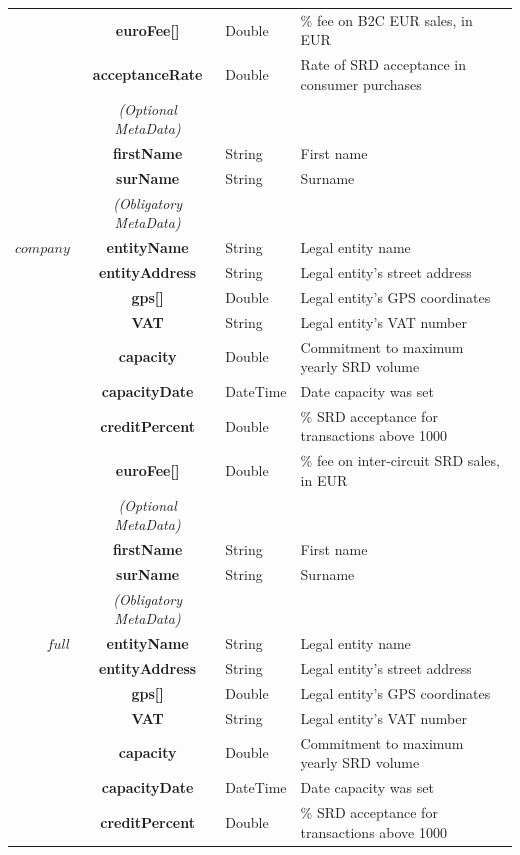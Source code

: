 \begin{table}[H]
\begin{centering}
{\begin{tabular}{ r | c | l | l }
			& {\bf euroFee[]}			&Double	& \% fee on B2C EUR sales, in EUR \\
			& {\bf acceptanceRate}		&Double	& Rate of SRD acceptance in consumer purchases\\
\cline{2-2}
			 & \emph{(Optional MetaData)}& & \\
\cline{2-2}
			& {\bf firstName	}			&String	& First name \\
			& {\bf surName}			&String	& Surname \\
\Xhline{1.5pt}
			& \emph{(Obligatory MetaData)} & & \\
\cline{2-2}
$company$	& {\bf entityName}			&String	& Legal entity name \\
			& {\bf entityAddress}			&String	& Legal entity's street address \\
			& {\bf gps[]}				&Double	& Legal entity's GPS coordinates \\
			& {\bf VAT}				&String	& Legal entity's VAT number \\
			& {\bf capacity}				&Double	& Commitment to maximum yearly SRD volume \\
			& {\bf capacityDate}			&DateTime & Date capacity was set \\
			& {\bf creditPercent}			&Double	& \% SRD acceptance for transactions above 1000 \\
			& {\bf euroFee[]}			&Double	& \% fee on inter-circuit SRD sales, in EUR \\
\cline{2-2}
			 & \emph{(Optional MetaData)}& & \\
\cline{2-2}
			& {\bf firstName	}			&String & First name \\
			& {\bf surName}			&String & Surname \\
\Xhline{1.5pt}
			& \emph{(Obligatory MetaData)} & & \\
\cline{2-2}
$full$		& {\bf entityName}			&String	& Legal entity name \\
			& {\bf entityAddress}			&String	& Legal entity's street address \\
			& {\bf gps[]}				&Double	& Legal entity's GPS coordinates \\
			& {\bf VAT}				&String	& Legal entity's VAT number \\
			& {\bf capacity}				&Double	& Commitment to maximum yearly SRD volume \\
			& {\bf capacityDate}			&DateTime & Date capacity was set \\
			& {\bf creditPercent}			&Double	& \% SRD acceptance for transactions above 1000 \\

\end{tabular}}
\end{centering}
\end{table}
